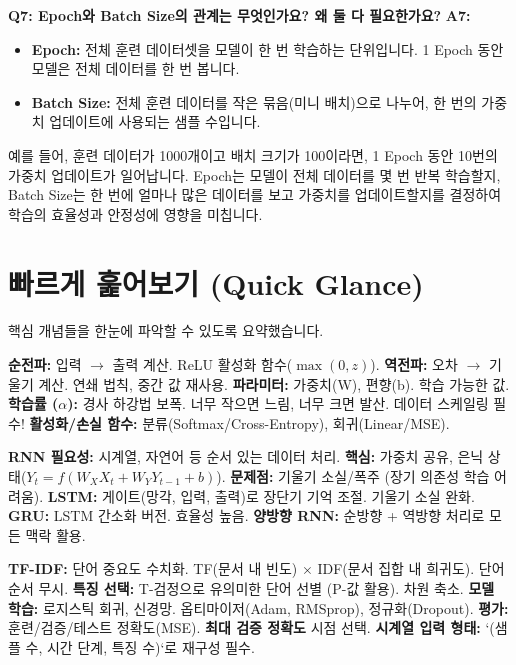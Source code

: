 \documentclass[11pt,a4paper]{article}
\begin{document}
\begin{tcolorbox}[title=\textbf{자주 묻는 질문}]
\textbf{Q7: Epoch와 Batch Size의 관계는 무엇인가요? 왜 둘 다 필요한가요?}
\textbf{A7:}
\begin{itemize}
    \item \textbf{Epoch:} 전체 훈련 데이터셋을 모델이 한 번 학습하는 단위입니다. 1 Epoch 동안 모델은 전체 데이터를 한 번 봅니다.
    \item \textbf{Batch Size:} 전체 훈련 데이터를 작은 묶음(미니 배치)으로 나누어, 한 번의 가중치 업데이트에 사용되는 샘플 수입니다.
\end{itemize}
예를 들어, 훈련 데이터가 1000개이고 배치 크기가 100이라면, 1 Epoch 동안 10번의 가중치 업데이트가 일어납니다. Epoch는 모델이 전체 데이터를 몇 번 반복 학습할지, Batch Size는 한 번에 얼마나 많은 데이터를 보고 가중치를 업데이트할지를 결정하여 학습의 효율성과 안정성에 영향을 미칩니다.
\end{tcolorbox}

\newpage
\section{빠르게 훑어보기 (Quick Glance)}
핵심 개념들을 한눈에 파악할 수 있도록 요약했습니다.

\begin{tcolorbox}[colback=myblue!10!white, colframe=myblue!75!black, title=\textbf{신경망 기본}]
\textbf{순전파:} 입력 $\rightarrow$ 출력 계산. ReLU 활성화 함수($\max(0,z)$).
\textbf{역전파:} 오차 $\rightarrow$ 기울기 계산. 연쇄 법칙, 중간 값 재사용.
\textbf{파라미터:} 가중치(W), 편향(b). 학습 가능한 값.
\textbf{학습률 ($\alpha$):} 경사 하강법 보폭. 너무 작으면 느림, 너무 크면 발산. 데이터 스케일링 필수!
\textbf{활성화/손실 함수:} 분류(Softmax/Cross-Entropy), 회귀(Linear/MSE).
\end{tcolorbox}

\begin{tcolorbox}[colback=mygreen!10!white, colframe=mygreen!75!black, title=\textbf{시퀀스 데이터와 RNN}]
\textbf{RNN 필요성:} 시계열, 자연어 등 순서 있는 데이터 처리.
\textbf{핵심:} 가중치 공유, 은닉 상태($Y_t = f(W_X X_t + W_Y Y_{t-1} + b)$).
\textbf{문제점:} 기울기 소실/폭주 (장기 의존성 학습 어려움).
\textbf{LSTM:} 게이트(망각, 입력, 출력)로 장단기 기억 조절. 기울기 소실 완화.
\textbf{GRU:} LSTM 간소화 버전. 효율성 높음.
\textbf{양방향 RNN:} 순방향 + 역방향 처리로 모든 맥락 활용.
\end{tcolorbox}

\begin{tcolorbox}[colback=myorange!10!white, colframe=myorange!75!black, title=\textbf{텍스트 처리 및 모델 평가}]
\textbf{TF-IDF:} 단어 중요도 수치화. TF(문서 내 빈도) $\times$ IDF(문서 집합 내 희귀도). 단어 순서 무시.
\textbf{특징 선택:} T-검정으로 유의미한 단어 선별 (P-값 활용). 차원 축소.
\textbf{모델 학습:} 로지스틱 회귀, 신경망. 옵티마이저(Adam, RMSprop), 정규화(Dropout).
\textbf{평가:} 훈련/검증/테스트 정확도(MSE). \textbf{최대 검증 정확도} 시점 선택.
\textbf{시계열 입력 형태:} `(샘플 수, 시간 단계, 특징 수)`로 재구성 필수.
\end{tcolorbox}
\end{document}
